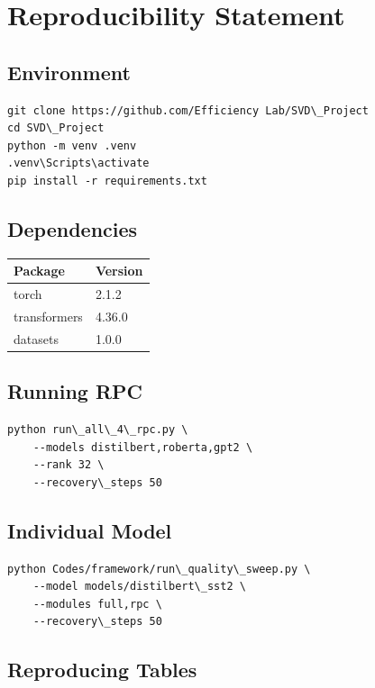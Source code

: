 
\section{Reproducibility Statement}

\subsection{Environment}

\begin{lstlisting}
git clone https://github.com/Efficiency Lab/SVD\_Project
cd SVD\_Project
python -m venv .venv
.venv\Scripts\activate
pip install -r requirements.txt
\end{lstlisting}

\subsection{Dependencies}

\begin{table}[H]
\centering
\small
\begin{tabular}{ll}
\toprule
\textbf{Package} & \textbf{Version} \\
\midrule
torch & 2.1.2 \\
transformers & 4.36.0 \\
datasets & 1.0.0 \\
\bottomrule
\end{tabular}
\end{table}

\subsection{Running RPC}

\begin{lstlisting}
python run\_all\_4\_rpc.py \
    --models distilbert,roberta,gpt2 \
    --rank 32 \
    --recovery\_steps 50
\end{lstlisting}

\subsection{Individual Model}

\begin{lstlisting}
python Codes/framework/run\_quality\_sweep.py \
    --model models/distilbert\_sst2 \
    --modules full,rpc \
    --recovery\_steps 50
\end{lstlisting}

\subsection{Reproducing Tables}


